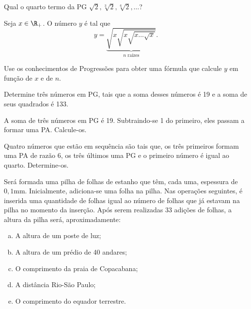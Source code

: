 \begin{exercise}
    Qual o quarto termo da PG $\sqrt 2 , \sqrt[3] 2 , \sqrt[6] 2 ,
\dots$?
\end{exercise}

\begin{exercise}
    Seja $x \in \R_+$. O número $y$ é tal que
$$y= \underbrace{\sqrt{x \sqrt{x \sqrt{x \dots \sqrt x}}}}_{n \text{ raízes}}.$$

Use os conhecimentos de Progressões para obter uma fórmula que calcule $y$ em função de $x$ e de $n$.
\end{exercise}

\begin{exercise}
    Determine três números em PG, tais que a soma desses números é
19 e a soma de seus quadrados é 133.
\end{exercise}

\begin{exercise}
    A soma de três números em PG é 19. Subtraindo-se 1 do primeiro,
eles passam a formar uma PA. Calcule-os.
\end{exercise}

\begin{exercise}
    Quatro números que estão em sequência são tais que, os três
primeiros formam uma PA de razão 6, os três últimos uma PG e o
primeiro número é igual ao quarto. Determine-os.
\end{exercise}

\begin{exercise}
Será formada uma pilha de folhas de estanho que têm, cada uma,
espessura de $0,1$mm. Inicialmente, adiciona-se uma folha na pilha.
Nas operações seguintes, é inserida uma quantidade de folhas igual
ao número de folhas que já estavam na pilha no momento da inserção.
Após serem realizadas 33 adições de folhas, a altura da pilha será,
aproximadamente:
\begin{enumerate}[a)]
  \item A altura de um poste de luz;
  \item A altura de um prédio de 40 andares;
  \item O comprimento da praia de Copacabana;
  \item A distância Rio-São Paulo;
  \item O comprimento do equador terrestre.
\end{enumerate}
\end{exercise}

